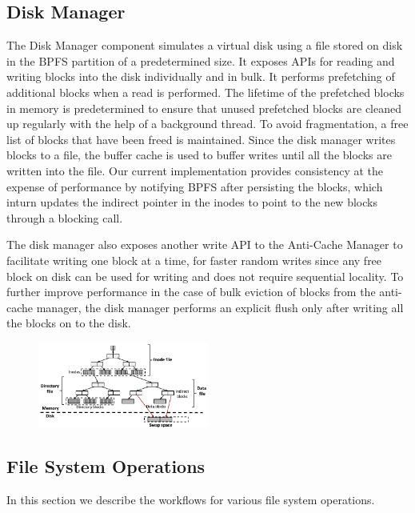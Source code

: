 \subsection{Disk Manager}
The Disk Manager component simulates a virtual disk using a file stored on disk in the BPFS partition of a predetermined size. It exposes APIs for reading and writing blocks into the disk individually and in bulk. It performs prefetching of additional blocks when a read is performed. The lifetime of the prefetched blocks in memory is predetermined to ensure that unused prefetched blocks are cleaned up regularly with the help of a background thread. To avoid fragmentation, a free list of blocks that have been freed is maintained. Since the disk manager writes blocks to a file, the buffer cache is used to buffer writes until all the blocks are written into the file. Our current implementation provides consistency at the expense of performance by notifying BPFS after persisting the blocks, which inturn updates the indirect pointer in the inodes to point to the new blocks through a blocking call.

The disk manager also exposes another write API to the Anti-Cache Manager to facilitate writing one block at a time, for faster random writes since any free block on disk can be used for writing and does not require sequential locality. To further improve performance in the case of bulk eviction of blocks from the anti-cache manager, the disk manager performs an explicit flush only after writing all the blocks on to the disk.

\begin{figure}
\centering
\vspace{-0.2in}
\includegraphics[width=0.5\textwidth]{figs/bpfs2.pdf}
\vspace{-0.2in}
\end{figure}

\subsection{File System Operations}
In this section we describe the workflows for various file system operations.
